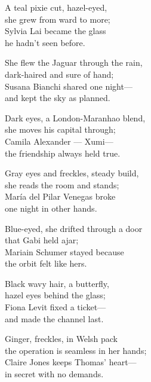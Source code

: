 \begin{lyrics}
A teal pixie cut, hazel-eyed,\\
she grew from ward to more;\\
Sylvia Lai became the glass\\
he hadn't seen before.

She flew the Jaguar through the rain,\\
dark-haired and sure of hand;\\
Susana Bianchi shared one night—\\
and kept the sky as planned.

Dark eyes, a London-Maranhao blend,\\
she moves his capital through;\\
Camila Alexander — Xumi—\\
the friendship always held true.

Gray eyes and freckles, steady build,\\
she reads the room and stands;\\
María del Pilar Venegas broke\\
one night in other hands.

Blue-eyed, she drifted through a door\\
that Gabi held ajar;\\
Mariain Schumer stayed because\\
the orbit felt like hers.

Black wavy hair, a butterfly,\\
hazel eyes behind the glass;\\
Fiona Levit fixed a ticket—\\
and made the channel last.

Ginger, freckles, in Welsh pack\\
the operation is seamless in her hands;\\
Claire Jones  keeps Thomas' heart—\\
in secret with no demands.
\end{lyrics}

